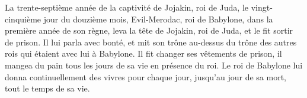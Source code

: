 \begin{multicols}{2}
La trente-septième année de la captivité de Jojakin, roi de Juda, le vingt-cinquième jour du douzième mois, Evil-Merodac, roi de Babylone, dans la première année de son règne, leva la tête de Jojakin, roi de Juda, et le fit sortir de prison.
Il lui parla avec bonté, et mit son trône au-dessus du trône des autres rois qui étaient avec lui à Babylone.
Il fit changer ses vêtements de prison, il mangea du pain tous les jours de sa vie en présence du roi.
Le roi de Babylone lui donna continuellement des vivres pour chaque jour, jusqu'au jour de sa mort, tout le temps de sa vie.
\PPE{}
\end{multicols}

